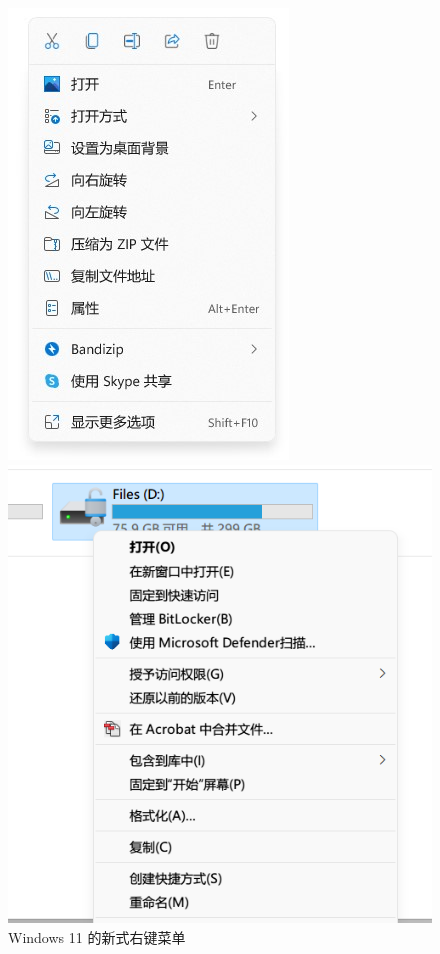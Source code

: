 \begin{figure}[htb!]
  \centering
  \begin{minipage}{.45\textwidth}
    \centering
    \includegraphics[width=.85\textwidth]{assets/advanced/Windows11_Right_click.jpg}
    \caption{Windows 11 的新式右键菜单}
    \label{fig:Windows11_Right_click}
  \end{minipage}
  \begin{minipage}{.54\textwidth}
    \centering
    \includegraphics[width=.85\textwidth]{assets/advanced/Old_right_click.png}

\end{minipage}
\end{figure}
